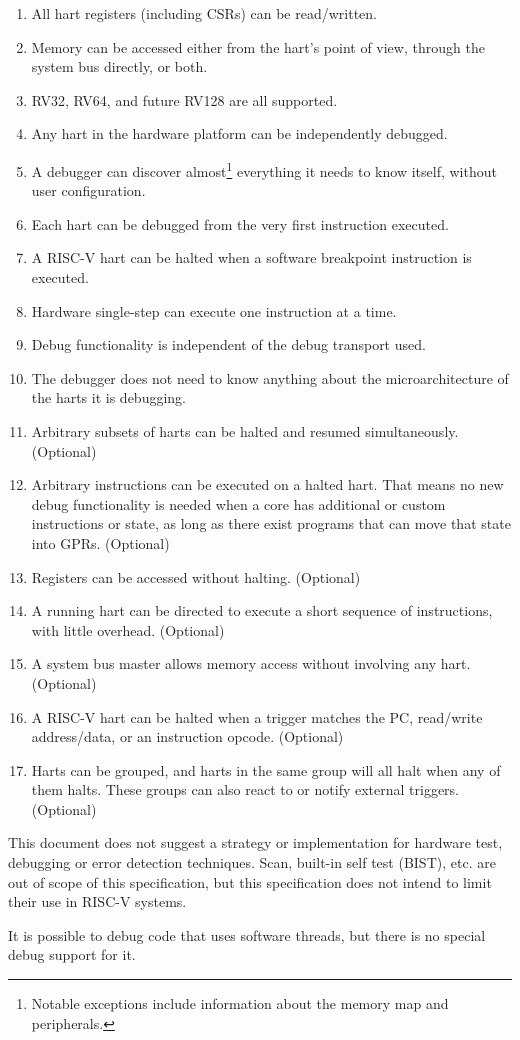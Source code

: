 \begin{enumerate}
   \item All hart registers (including CSRs) can be read/written.
   \item Memory can be accessed either from the hart's point of view, through
       the system bus directly, or both.
   \item RV32, RV64, and future RV128 are all supported.
   \item Any hart in the hardware platform can be independently debugged.
   \item A debugger can discover almost\footnote{Notable exceptions include
       information about the memory map and peripherals.} everything it needs
       to know itself, without user configuration.
   \item Each hart can be debugged from the very first instruction executed.
   \item A RISC-V hart can be halted when a software breakpoint instruction is
       executed.
   \item Hardware single-step can execute one instruction at a time.
   \item Debug functionality is independent of the debug transport used.
   \item The debugger does not need to know anything about the microarchitecture
       of the harts it is debugging.

   \item Arbitrary subsets of harts can be halted and resumed simultaneously.
       (Optional)
   \item Arbitrary instructions can be executed on
       a halted hart. That means no new debug functionality is needed when a
       core has additional or custom instructions or state, as
       long as there exist programs
       that can move that state into GPRs. (Optional)
   \item Registers can be accessed without halting. (Optional)
   \item A running hart can be directed to execute a short sequence
       of instructions, with little overhead. (Optional)
   \item A system bus master allows memory access without
       involving any hart. (Optional)
   \item A RISC-V hart can be halted when a trigger matches the PC,
       read/write address/data, or an instruction opcode. (Optional)
    \item Harts can be grouped, and harts in the same group will all halt when
        any of them halts. These groups can also react to or notify external
        triggers. (Optional)
\end{enumerate}

This document does not suggest a strategy or implementation for hardware test,
debugging or error detection techniques. Scan, built-in self test (BIST), etc. are out of scope of
this specification, but this specification does not intend to limit their use
in RISC-V systems.

It is possible to debug code that uses software threads, but there is no
special debug support for it.
